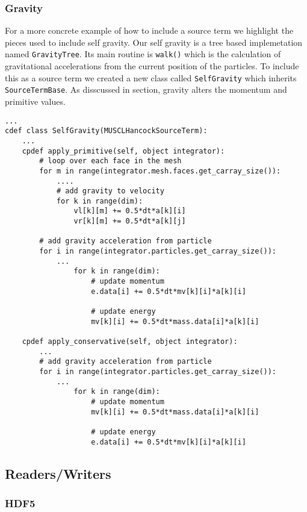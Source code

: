 \subsubsection{Gravity}
For a more concrete example of how to include a source term we highlight the
pieces used to include self gravity. Our self gravity is a tree based implemetation
named \lstinline{GravityTree}. Its main routine is \lstinline{walk()} which is the
calculation of gravitational accelerations from the current position of the particles.
To include this as a source term we created a new class called \lstinline{SelfGravity}
which inherits \lstinline{SourceTermBase}. As disscussed in section, gravity alters
the momentum and primitive values.
\begin{lstlisting}
...
cdef class SelfGravity(MUSCLHancockSourceTerm):
    ...
    cpdef apply_primitive(self, object integrator):
        # loop over each face in the mesh 
        for m in range(integrator.mesh.faces.get_carray_size()):
            ....
            # add gravity to velocity
            for k in range(dim):
                vl[k][m] += 0.5*dt*a[k][i]
                vr[k][m] += 0.5*dt*a[k][j]

        # add gravity acceleration from particle
        for i in range(integrator.particles.get_carray_size()):
            ...
                for k in range(dim):
                    # update momentum
                    e.data[i] += 0.5*dt*mv[k][i]*a[k][i]

                    # update energy 
                    mv[k][i] += 0.5*dt*mass.data[i]*a[k][i]

    cpdef apply_conservative(self, object integrator):
        ...
        # add gravity acceleration from particle
        for i in range(integrator.particles.get_carray_size()):
            ...
                for k in range(dim):
                    # update momentum
                    mv[k][i] += 0.5*dt*mass.data[i]*a[k][i]

                    # update energy 
                    e.data[i] += 0.5*dt*mv[k][i]*a[k][i]
\end{lstlisting}

\subsection{Readers/Writers}
\subsubsection{HDF5}

